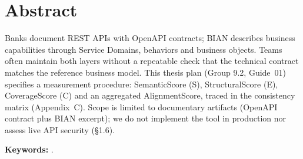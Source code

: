 \chapter*{Abstract}

Banks document REST APIs with OpenAPI contracts; BIAN describes business capabilities through
Service Domains, behaviors and business objects. Teams often maintain both layers without a
repeatable check that the technical contract matches the reference business model. This thesis
plan (Group 9.2, Guide~01) specifies a measurement procedure: SemanticScore (S), StructuralScore
(E), CoverageScore (C) and an aggregated AlignmentScore, traced in the consistency matrix
(Appendix~C). Scope is limited to documentary artifacts (OpenAPI contract plus BIAN excerpt); we
do not implement the tool in production nor assess live API security (§1.6).

\vspace{0.5cm}
\noindent\textbf{Keywords:} \palabrasClaveEN.
